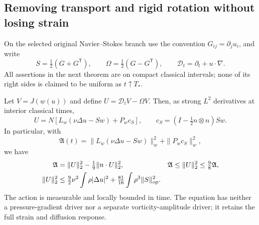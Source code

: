 \subsection{Removing transport and rigid rotation without losing strain}

On the selected original Navier--Stokes branch use the convention
$G_{ij}=\partial_j u_i$, and write
\[
 S=\tfrac12(G+G^{\mathsf T}),\qquad
 \Omega=\tfrac12(G-G^{\mathsf T}),\qquad
 \mathcal D_t=\partial_t+u\cdot\nabla.
\]
All assertions in the next theorem are on compact classical intervals;
none of its right sides is claimed to be uniform as $t\uparrow T_*$.

\begin{theorem}\label{mr:material}
Let $V=J(w(u))$ and define $U=\mathcal D_tV-\Omega V$. Then, as
strong $L^2$ derivatives at interior classical times,
\begin{equation}\label{mr:exact-driver}
 U=N\left[L_w(\nu\Delta u-Sw)+P_wc_S\right],
 \qquad c_S=(I-\tfrac12n\otimes n)Sw.
\end{equation}
In particular, with
\begin{equation}\label{mr:action}
 \mathfrak A(t)=\|L_w(\nu\Delta u-Sw)\|_w^2+\|P_wc_S\|_w^2,
\end{equation}
we have
\begin{align}
 \mathfrak A&=\|U\|_2^2-\tfrac19\|n\cdot U\|_2^2,
 &\mathfrak A\le\|U\|_2^2&\le\tfrac98\mathfrak A,\label{mr:two-sided}\\
 \|U\|_2^2&\le\tfrac92\nu^2\int\rho|\Delta u|^2
              +\tfrac{81}{16}\int\rho^3\|S\|_{\rm op}^2.
 &&\label{mr:action-bound}
\end{align}
The action is measurable and locally bounded in time. The equation has
neither a pressure-gradient driver nor a separate vorticity-amplitude
driver; it retains the full strain and diffusion response.
\end{theorem}

